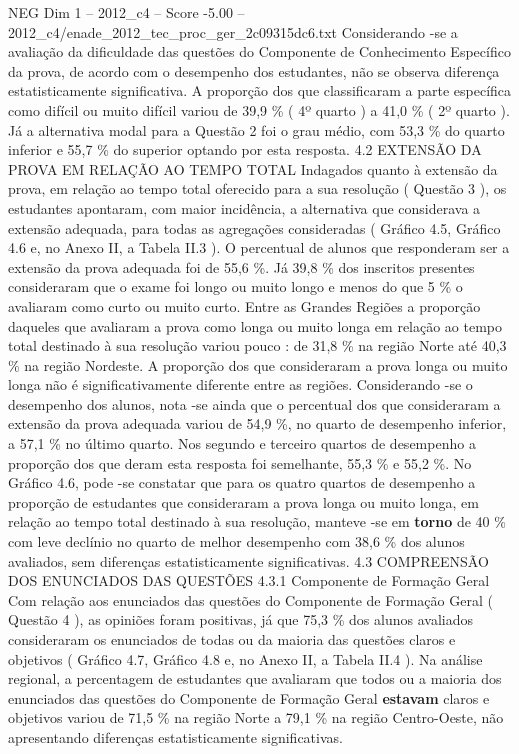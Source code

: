 \begin{textsample}{NEG Dim 1 – 2012\_c4 – Score -5.00 – 2012\_c4/enade\_2012\_tec\_proc\_ger\_2c09315dc6.txt}
Considerando -se a avaliação da dificuldade das questões do Componente de Conhecimento Específico da prova, de acordo com o desempenho dos estudantes, não se observa diferença estatisticamente significativa.
A proporção dos que classificaram a parte específica como difícil ou muito difícil variou de 39,9 \% ( 4º quarto ) a 41,0 \% ( 2º quarto ).
Já a alternativa modal para a Questão 2 foi o grau médio, com 53,3 \% do quarto inferior e 55,7 \% do superior optando por esta resposta. 4.2 EXTENSÃO DA PROVA EM RELAÇÃO AO TEMPO TOTAL Indagados quanto à extensão da prova, em relação ao tempo total oferecido para a sua resolução ( Questão 3 ), os estudantes apontaram, com maior incidência, a alternativa que considerava a extensão adequada, para todas as agregações consideradas ( Gráfico 4.5, Gráfico 4.6 e, no Anexo II, a Tabela II.3 ).
O percentual de alunos que responderam ser a extensão da prova adequada foi de 55,6 \%.
Já 39,8 \% dos inscritos presentes consideraram que o exame foi longo ou muito longo e menos do que 5 \% o avaliaram como curto ou muito curto.
Entre as Grandes Regiões a proporção daqueles que avaliaram a prova como longa ou muito longa em relação ao tempo total destinado à sua resolução variou pouco : de 31,8 \% na região Norte até 40,3 \% na região Nordeste.
A proporção dos que consideraram a prova longa ou muito longa não é significativamente diferente entre as regiões.
Considerando -se o desempenho dos alunos, nota -se ainda que o percentual dos que consideraram a extensão da prova adequada variou de 54,9 \%, no quarto de desempenho inferior, a 57,1 \% no último quarto.
Nos segundo e terceiro quartos de desempenho a proporção dos que deram esta resposta foi semelhante, 55,3 \% e 55,2 \%.
No Gráfico 4.6, pode -se constatar que para os quatro quartos de desempenho a proporção de estudantes que consideraram a prova longa ou muito longa, em relação ao tempo total destinado à sua resolução, manteve -se em \textbf{torno} de 40 \% com leve declínio no quarto de melhor desempenho com 38,6 \% dos alunos avaliados, sem diferenças estatisticamente significativas. 4.3 COMPREENSÃO DOS ENUNCIADOS DAS QUESTÕES 4.3.1 Componente de Formação Geral Com relação aos enunciados das questões do Componente de Formação Geral ( Questão 4 ), as opiniões foram positivas, já que 75,3 \% dos alunos avaliados consideraram os enunciados de todas ou da maioria das questões claros e objetivos ( Gráfico 4.7, Gráfico 4.8 e, no Anexo II, a Tabela II.4 ).
Na análise regional, a percentagem de estudantes que avaliaram que todos ou a maioria dos enunciados das questões do Componente de Formação Geral \textbf{estavam} claros e objetivos variou de 71,5 \% na região Norte a 79,1 \% na região Centro-Oeste, não apresentando diferenças estatisticamente significativas.

\end{textsample}
